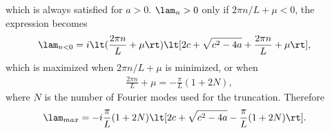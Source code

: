 \documentclass[a4paper,10pt]{article}
\begin{document}
which is always satisfied for $a>0$. $\lam_n>0$ only if $2\pi n/L+\mu<0$, the
expression becomes
\begin{align}
  \lam_{n<0} &= i \lt(\frac{2\pi n}{L}+\mu\rt)\lt[2c + \sqrt{c^2-4a} +
  \frac{2\pi n}L + \mu\rt],
\end{align}
which is maximized when $2\pi n/L+\mu$ is minimized, or when 
\begin{align}
  \frac{2\pi n}{L}+\mu = -\frac{\pi}{L}(1+2N),
\end{align}
where $N$ is the number of Fourier modes used for the truncation. Therefore
\begin{align}
  \lam_{max} &=  -i \frac{\pi}{L}(1+2N)\lt[ 2c + \sqrt{c^2-4a} - \frac\pi
  L(1+2N)\rt].
\end{align}






{\footnotesize

}
\end{document}
